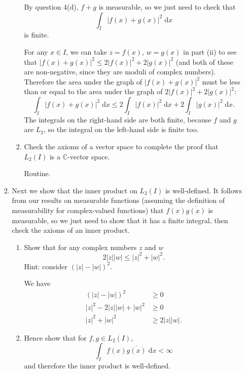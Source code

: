\documentclass{article}
\newcommand{\diff}{\;\mathrm{d}}
\begin{document}
\begin{enumerate}
\begin{enumerate}
\begin{enumerate}
						{\color{blue}
							By question 4(d), $f+g$ is measurable, so we just need to check that
							\[\int_I |f(x)+g(x)|^2\diff x\]
							is finite.
							
							For any $x\in I$, we can take $z=f(x)$, $w=g(x)$ in part (ii) to see that $|f(x)+g(x)|^2\leq 2|f(x)|^2+2|g(x)|^2$ (and both of these are non-negative, since they are moduli of complex numbers). Therefore the area under the graph of $|f(x)+g(x)|^2$ must be less than or equal to the area under the graph of $2|f(x)|^2+2|g(x)|^2$:
							\[\int_I|f(x)+g(x)|^2\diff x\leq 2\int_I |f(x)|^2\diff x + 2\int_I |g(x)|^2\diff x.\]
							The integrals on the right-hand side are both finite, because $f$ and $g$ are $L_2$, so the integral on the left-hand side is finite too.
						}
					
					\item Check the axioms of a vector space to complete the proof that $L_2(I)$ is a $\mathbb{C}$-vector space.
					
						{\color{blue}
							Routine.
						}
					
				\end{enumerate}
			\item Next we show that the inner product on $L_2(I)$ is well-defined. It follows from our results on measurable functions (assuming the definition of measurability for complex-valued functions) that $f(x)\overline{g(x)}$ is measurable, so we just need to show that it has a finite integral, then check the axioms of an inner product.
				\begin{enumerate}
					\item Show that for any complex numbers $z$ and $w$
						\[2|z||w|\leq |z|^2+|w|^2.\]
						Hint: consider $\left(|z|-|w|\right)^2$.
						
						{\color{blue}
							We have
							\begin{align*}
								\left(|z|-|w|\right)^2 &\geq 0\\
								|z|^2-2|z||w|+|w|^2&\geq 0\\
								|z|^2+|w|^2&\geq 2|z||w|.
							\end{align*}
						}
					
					\item Hence show that for $f,g\in L_2(I)$,
						\[\int_I f(x)\overline{g(x)}\diff x < \infty\]
						and therefore the inner product is well-defined.
						

\end{enumerate}
\end{enumerate}
\end{enumerate}
\end{document}
